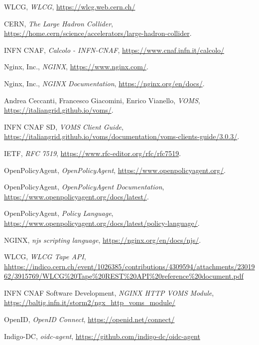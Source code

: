 \begin{thebibliography}{99}
	
	WLCG, 
	\textit{WLCG},
	\url{https://wlcg.web.cern.ch/}

	CERN, 
	\textit{The Large Hadron Collider},
	\url{https://home.cern/science/accelerators/large-hadron-collider}.

	INFN CNAF,
	\textit{Calcolo - INFN-CNAF},
	\url{https://www.cnaf.infn.it/calcolo/}

	Nginx, Inc.,
	\textit{NGINX},
	\url{https://www.nginx.com/}.

	Nginx, Inc.,
	\textit{NGINX Documentation},
	\url{https://nginx.org/en/docs/}.

	Andrea Ceccanti, Francesco Giacomini, Enrico Vianello,
	\textit{VOMS},
	\url{https://italiangrid.github.io/voms/}.

	INFN CNAF SD,
	\textit{VOMS Client Guide},
	\url{https://italiangrid.github.io/voms/documentation/voms-clients-guide/3.0.3/}.

	IETF,
	\textit{RFC 7519},
	\url{https://www.rfc-editor.org/rfc/rfc7519}.

	OpenPolicyAgent,
	\textit{OpenPolicyAgent},
	\url{https://www.openpolicyagent.org/}.

	OpenPolicyAgent,
	\textit{OpenPolicyAgent Documentation},
	\url{https://www.openpolicyagent.org/docs/latest/}.

	OpenPolicyAgent,
	\textit{Policy Language},
	\url{https://www.openpolicyagent.org/docs/latest/policy-language/}.

	NGINX,
	\textit{njs scripting language},
	\url{https://nginx.org/en/docs/njs/}.
    
	WLCG,
	\textit{WLCG Tape API},
	\url{hhttps://indico.cern.ch/event/1026385/contributions/4309594/attachments/2301962/3915769/WLCG%20Tape%20REST%20API%20reference%20document.pdf}

	INFN CNAF Software Development,
	\textit{NGINX HTTP VOMS Module},
	\url{https://baltig.infn.it/storm2/ngx_http_voms_module/}

	OpenID, 
	\textit{OpenID Connect},
	\url{https://openid.net/connect/}

	Indigo-DC, \textit{oidc-agent}, 
	\url{https://github.com/indigo-dc/oidc-agent}


\end{thebibliography}
